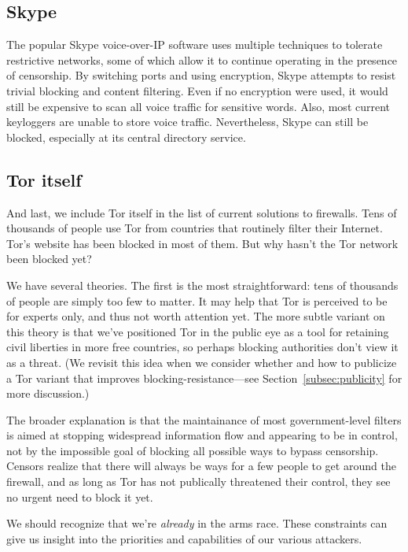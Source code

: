 \documentclass{llncs}
\begin{document}
\subsection{Skype}

The popular Skype voice-over-IP software uses multiple techniques to tolerate
restrictive networks, some of which allow it to continue operating in the
presence of censorship.  By switching ports and using encryption, Skype
attempts to resist trivial blocking and content filtering.  Even if no
encryption were used, it would still be expensive to scan all voice
traffic for sensitive words.  Also, most current keyloggers are unable to
store voice traffic.  Nevertheless, Skype can still be blocked, especially at
its central directory service.

\subsection{Tor itself}

And last, we include Tor itself in the list of current solutions
to firewalls. Tens of thousands of people use Tor from countries that
routinely filter their Internet. Tor's website has been blocked in most
of them. But why hasn't the Tor network been blocked yet?

We have several theories. The first is the most straightforward: tens of
thousands of people are simply too few to matter. It may help that Tor is
perceived to be for experts only, and thus not worth attention yet. The
more subtle variant on this theory is that we've positioned Tor in the
public eye as a tool for retaining civil liberties in more free countries,
so perhaps blocking authorities don't view it as a threat. (We revisit
this idea when we consider whether and how to publicize a Tor variant
that improves blocking-resistance---see Section~\ref{subsec:publicity}
for more discussion.)

The broader explanation is that the maintainance of most government-level
filters is aimed at stopping widespread information flow and appearing to be
in control, not by the impossible goal of blocking all possible ways to bypass
censorship. Censors realize that there will always
be ways for a few people to get around the firewall, and as long as Tor
has not publically threatened their control, they see no urgent need to
block it yet.

We should recognize that we're \emph{already} in the arms race. These
constraints can give us insight into the priorities and capabilities of
our various attackers.
\end{document}
